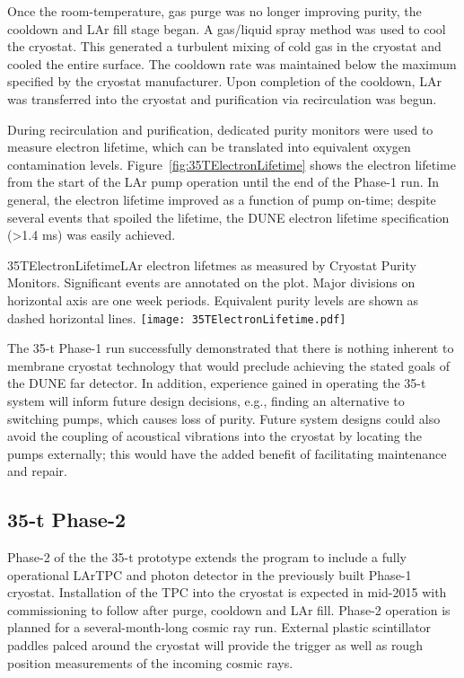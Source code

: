 Once the room-temperature, gas purge was no longer improving purity,
the cooldown and LAr fill stage began.
A gas/liquid spray method was used to cool the cryostat.
This generated a turbulent mixing of cold gas in the cryostat and cooled the entire surface.
The cooldown rate was maintained below the maximum specified by the cryostat manufacturer.
Upon completion of the cooldown, LAr was transferred into the cryostat and %
purification via recirculation was begun. 

During recirculation and purification, dedicated purity monitors were used to measure electron lifetime, which can
be translated into equivalent oxygen contamination levels.
Figure~\ref{fig:35TElectronLifetime} shows the electron lifetime from the start of the
LAr pump operation until the end of the Phase-1 run.
In general, the electron lifetime improved as a function of pump
on-time; despite %
several events that spoiled the lifetime, %
the DUNE electron lifetime
specification (>1.4 ms) was easily achieved.

\begin{cdrfigure}{35TElectronLifetime}{LAr electron lifetmes as measured by
Cryostat Purity Monitors. Significant events are annotated on the plot. Major divisions on horizontal axis
are one week periods. Equivalent purity levels are shown as dashed horizontal lines.}
\texttt{[image: 35TElectronLifetime.pdf]}
\end{cdrfigure}

The 35-t Phase-1 run successfully demonstrated that there is nothing %
inherent to
membrane cryostat technology that would preclude achieving the stated goals of the
DUNE far detector. In addition, experience gained in operating the 35-t system
will inform future design decisions, e.g., finding an alternative to switching pumps, which
causes loss of purity.  %
Future system
designs could also avoid the coupling of acoustical vibrations into the cryostat by %
locating the pumps externally; this would have the added benefit of facilitating
maintenance and repair. 

\subsection{35-t Phase-2}
Phase-2 of the the 35-t prototype extends the program %
to include a fully operational LArTPC and
photon detector in the previously built Phase-1 cryostat.
Installation of the TPC into the cryostat is expected in mid-2015 with commissioning to follow
after purge, cooldown and LAr fill.  Phase-2 operation is planned for a several-month-long
cosmic ray run.  External plastic scintillator paddles palced around the cryostat will provide
the trigger as well as rough position measurements of the incoming cosmic rays.

